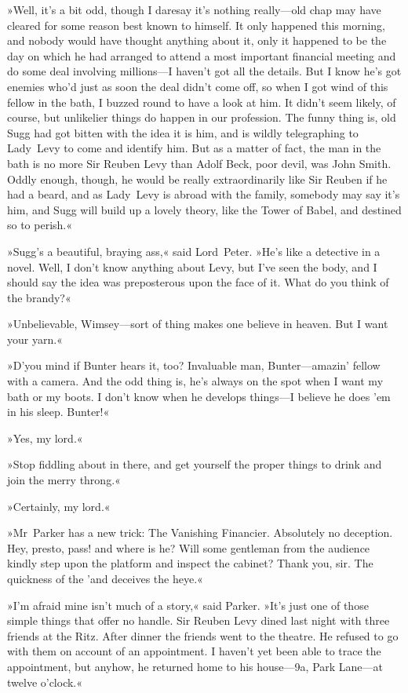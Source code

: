 »Well, it's a bit odd, though I daresay it's nothing really—old chap may have cleared for some reason best known to himself. It only happened this morning, and nobody would have thought anything about it, only it happened to be the day on which he had arranged to attend a most important financial meeting and do some deal involving millions—I haven't got all the details. But I know he's got enemies who'd just as soon the deal didn't come off, so when I got wind of this fellow in the bath, I buzzed round to have a look at him. It didn't seem likely, of course, but unlikelier things do happen in our profession. The funny thing is, old Sugg had got bitten with the idea it is him, and is wildly telegraphing to Lady~Levy to come and identify him. But as a matter of fact, the man in the bath is no more Sir Reuben Levy than Adolf Beck, poor devil, was John Smith. Oddly enough, though, he would be really extraordinarily like Sir Reuben if he had a beard, and as Lady~Levy is abroad with the family, somebody may say it's him, and Sugg will build up a lovely theory, like the Tower of Babel, and destined so to perish.«

»Sugg's a beautiful, braying ass,« said Lord~Peter. »He's like a detective in a novel. Well, I don't know anything about Levy, but I've seen the body, and I should say the idea was preposterous upon the face of it. What do you think of the brandy?«

»Unbelievable, Wimsey—sort of thing makes one believe in heaven. But I want your yarn.«

»D'you mind if Bunter hears it, too? Invaluable man, Bunter—amazin' fellow with a camera. And the odd thing is, he's always on the spot when I want my bath or my boots. I don't know when he develops things—I believe he does 'em in his sleep. Bunter!«

»Yes, my lord.«

»Stop fiddling about in there, and get yourself the proper things to drink and join the merry throng.«

»Certainly, my lord.«

»Mr~Parker has a new trick: The Vanishing Financier. Absolutely no deception. Hey, presto, pass! and where is he? Will some gentleman from the audience kindly step upon the platform and inspect the cabinet? Thank you, sir. The quickness of the 'and deceives the heye.«

»I'm afraid mine isn't much of a story,« said Parker. »It's just one of those simple things that offer no handle. Sir Reuben Levy dined last night with three friends at the Ritz. After dinner the friends went to the theatre. He refused to go with them on account of an appointment. I haven't yet been able to trace the appointment, but anyhow, he returned home to his house—9a, Park Lane—at twelve o'clock.«

